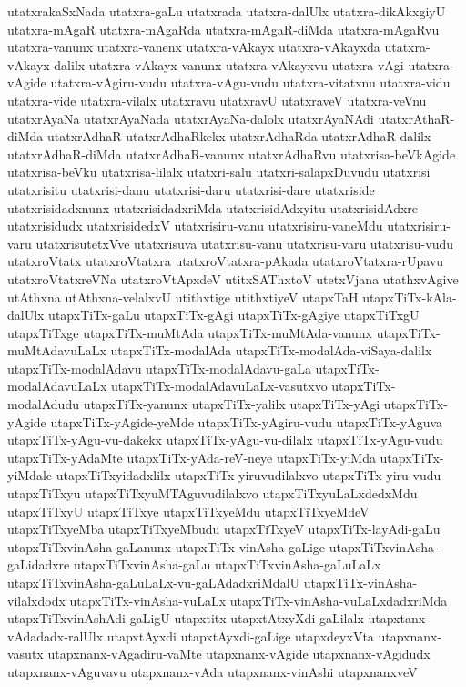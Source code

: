 {utatxrakaSxNada
utatxra-gaLu
utatxrada
utatxra-dalUlx
utatxra-dikAkxgiyU
utatxra-mAgaR
utatxra-mAgaRda
utatxra-mAgaR-diMda
utatxra-mAgaRvu
utatxra-vanunx
utatxra-vanenx
utatxra-vAkayx
utatxra-vAkayxda
utatxra-vAkayx-dalilx
utatxra-vAkayx-vanunx
utatxra-vAkayxvu
utatxra-vAgi
utatxra-vAgide
utatxra-vAgiru-vudu
utatxra-vAgu-vudu
utatxra-vitatxnu
utatxra-vidu
utatxra-vide
utatxra-vilalx
utatxravu
utatxravU
utatxraveV
utatxra-veVnu
utatxrAyaNa
utatxrAyaNada
utatxrAyaNa-dalolx
utatxrAyaNAdi
utatxrAthaR-diMda
utatxrAdhaR
utatxrAdhaRkekx
utatxrAdhaRda
utatxrAdhaR-dalilx
utatxrAdhaR-diMda
utatxrAdhaR-vanunx
utatxrAdhaRvu
utatxrisa-beVkAgide
utatxrisa-beVku
utatxrisa-lilalx
utatxri-salu
utatxri-salapxDuvudu
utatxrisi
utatxrisitu
utatxrisi-danu
utatxrisi-daru
utatxrisi-dare
utatxriside
utatxrisidadxnunx
utatxrisidadxriMda
utatxrisidAdxyitu
utatxrisidAdxre
utatxrisidudx
utatxrisidedxV
utatxrisiru-vanu
utatxrisiru-vaneMdu
utatxrisiru-varu
utatxrisutetxVve
utatxrisuva
utatxrisu-vanu
utatxrisu-varu
utatxrisu-vudu
utatxroVtatx
utatxroVtatxra
utatxroVtatxra-pAkada
utatxroVtatxra-rUpavu
utatxroVtatxreVNa
utatxroVtApxdeV
utitxSAThxtoV
utetxVjana
utathxvAgive
utAthxna
utAthxna-velalxvU
utithxtige
utithxtiyeV
utapxTaH
utapxTiTx-kAla-dalUlx
utapxTiTx-gaLu
utapxTiTx-gAgi
utapxTiTx-gAgiye
utapxTiTxgU
utapxTiTxge
utapxTiTx-muMtAda
utapxTiTx-muMtAda-vanunx
utapxTiTx-muMtAdavuLaLx
utapxTiTx-modalAda
utapxTiTx-modalAda-viSaya-dalilx
utapxTiTx-modalAdavu
utapxTiTx-modalAdavu-gaLa
utapxTiTx-modalAdavuLaLx
utapxTiTx-modalAdavuLaLx-vasutxvo
utapxTiTx-modalAdudu
utapxTiTx-yanunx
utapxTiTx-yalilx
utapxTiTx-yAgi
utapxTiTx-yAgide
utapxTiTx-yAgide-yeMde
utapxTiTx-yAgiru-vudu
utapxTiTx-yAguva
utapxTiTx-yAgu-vu-dakekx
utapxTiTx-yAgu-vu-dilalx
utapxTiTx-yAgu-vudu
utapxTiTx-yAdaMte
utapxTiTx-yAda-reV-neye
utapxTiTx-yiMda
utapxTiTx-yiMdale
utapxTiTxyidadxlilx
utapxTiTx-yiruvudilalxvo
utapxTiTx-yiru-vudu
utapxTiTxyu
utapxTiTxyuMTAguvudilalxvo
utapxTiTxyuLaLxdedxMdu
utapxTiTxyU
utapxTiTxye
utapxTiTxyeMdu
utapxTiTxyeMdeV
utapxTiTxyeMba
utapxTiTxyeMbudu
utapxTiTxyeV
utapxTiTx-layAdi-gaLu
utapxTiTxvinAsha-gaLanunx
utapxTiTx-vinAsha-gaLige
utapxTiTxvinAsha-gaLidadxre
utapxTiTxvinAsha-gaLu
utapxTiTxvinAsha-gaLuLaLx
utapxTiTxvinAsha-gaLuLaLx-vu-gaLAdadxriMdalU
utapxTiTx-vinAsha-vilalxdodx
utapxTiTx-vinAsha-vuLaLx
utapxTiTx-vinAsha-vuLaLxdadxriMda
utapxTiTxvinAshAdi-gaLigU
utapxtitx
utapxtAtxyXdi-gaLilalx
utapxtanx-vAdadadx-ralUlx
utapxtAyxdi
utapxtAyxdi-gaLige
utapxdeyxVta
utapxnanx-vasutx
utapxnanx-vAgadiru-vaMte
utapxnanx-vAgide
utapxnanx-vAgidudx
utapxnanx-vAguvavu
utapxnanx-vAda
utapxnanx-vinAshi
utapxnanxveV
}
